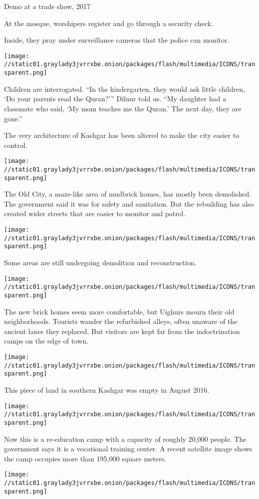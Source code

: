 Demo at a trade show, 2017

At the mosque, worshipers register and go through a security check.

Inside, they pray under surveillance cameras that the police can
monitor.

\texttt{[image: //static01.graylady3jvrrxbe.onion/packages/flash/multimedia/ICONS/transparent.png]}

Children are interrogated. ``In the kindergarten, they would ask little
children, `Do your parents read the Quran?''' Dilnur told us. ``My
daughter had a classmate who said, `My mom teaches me the Quran.' The
next day, they are gone.''

The very architecture of Kashgar has been altered to make the city
easier to control.

\texttt{[image: //static01.graylady3jvrrxbe.onion/packages/flash/multimedia/ICONS/transparent.png]}

The Old City, a maze-like area of mudbrick homes, has mostly been
demolished. The government said it was for safety and sanitation. But
the rebuilding has also created wider streets that are easier to monitor
and patrol.

\texttt{[image: //static01.graylady3jvrrxbe.onion/packages/flash/multimedia/ICONS/transparent.png]}

Some areas are still undergoing demolition and reconstruction.

\texttt{[image: //static01.graylady3jvrrxbe.onion/packages/flash/multimedia/ICONS/transparent.png]}

The new brick homes seem more comfortable, but Uighurs mourn their old
neighborhoods. Tourists wander the refurbished alleys, often unaware of
the ancient lanes they replaced. But visitors are kept far from the
indoctrination camps on the edge of town.

\texttt{[image: //static01.graylady3jvrrxbe.onion/packages/flash/multimedia/ICONS/transparent.png]}

This piece of land in southern Kashgar was empty in August 2016.

\texttt{[image: //static01.graylady3jvrrxbe.onion/packages/flash/multimedia/ICONS/transparent.png]}

Now this is a re-education camp with a capacity of roughly 20,000
people. The government says it is a vocational training center. A recent
satellite image shows the camp occupies more than 195,000 square meters.

\texttt{[image: //static01.graylady3jvrrxbe.onion/packages/flash/multimedia/ICONS/transparent.png]}

